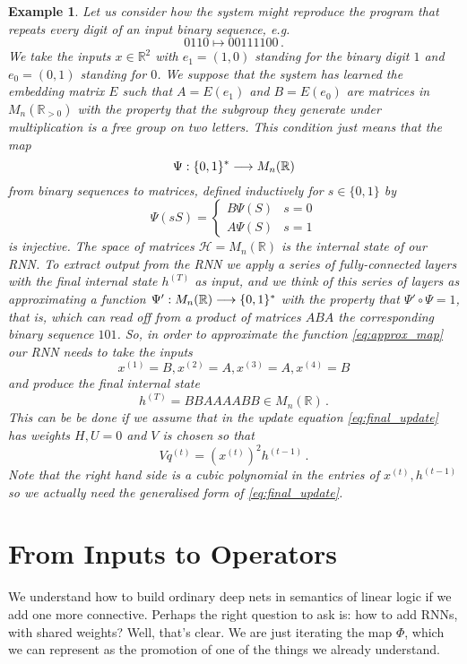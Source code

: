 \documentclass[english,letter paper,12pt,leqno]{article}
\theoremstyle{example}
\newtheorem{example}[theorem]{Example}
\numberwithin{equation}{section}
\def\be{\begin{equation}}
\def\ee{\end{equation}}
\begin{document}
\begin{example} Let us consider how the system might reproduce the program that repeats every digit of an input binary sequence, e.g.
\be\label{eq:approx_map}
0110 \longmapsto 00111100\,.
\ee
We take the inputs $x \in \mathbb{R}^2$ with $e_1 = (1,0)$ standing for the binary digit $1$ and $e_0 = (0,1)$ standing for $0$. We suppose that the system has learned the embedding matrix $E$ such that $A = E(e_1)$ and $B = E(e_0)$ are matrices in $M_n(\mathbb{R}_{>0})$ with the property that the subgroup they generate under multiplication is a free group on two letters. This condition just means that the map
\[
\Psi: \{0,1\}^* \longrightarrow M_n( \mathbb{R} )
\]
from binary sequences to matrices, defined inductively for $s \in \{0,1\}$ by
\[
\Psi( s S ) = \begin{cases} B \Psi(S) & s = 0 \\ A \Psi(S) & s = 1 \end{cases}
\]
is injective. The space of matrices $\mathscr{H} = M_n(\mathbb{R})$ is the internal state of our RNN. To extract output from the RNN we apply a series of fully-connected layers with the final internal state $h^{(T)}$ as input, and we think of this series of layers as approximating a function $\Psi': M_n(\mathbb{R}) \longrightarrow \{0,1\}^*$ with the property that $\Psi' \circ \Psi = 1$, that is, which can read off from a product of matrices $ABA$ the corresponding binary sequence $101$. So, in order to approximate the function \eqref{eq:approx_map} our RNN needs to take the inputs
\[
x^{(1)} = B, x^{(2)} = A, x^{(3)} = A, x^{(4)} = B
\]
and produce the final internal state
\[
h^{(T)} = BBAAAABB \in M_n(\mathbb{R})\,.
\]
This can be be done if we assume that in the update equation \eqref{eq:final_update} has weights $H, U = 0$ and $V$ is chosen so that
\[
V q^{(t)} = (x^{(t)})^2 h^{(t-1)}\,.
\]
Note that the right hand side is a cubic polynomial in the entries of $x^{(t)}, h^{(t-1)}$ so we actually need the generalised form of \eqref{eq:final_update}.
\end{example}

\section{From Inputs to Operators}

We understand how to build ordinary deep nets in semantics of linear logic if we add one more connective. Perhaps the right question to ask is: how to add RNNs, with shared weights? Well, that's clear. We are just iterating the map $\Phi$, which we can represent as the promotion of one of the things we already understand. 
\end{document}
